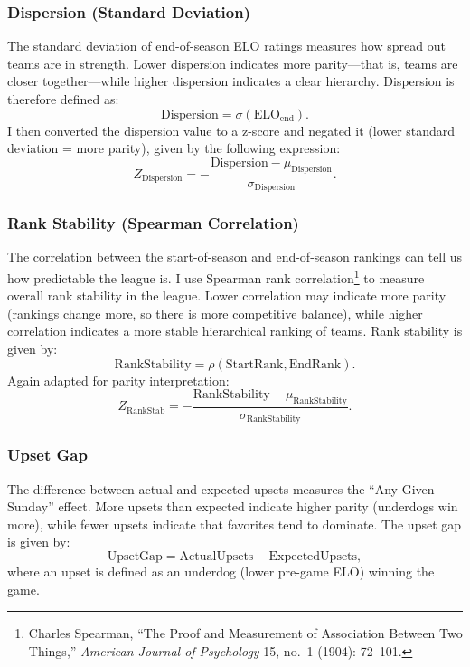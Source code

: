 \documentclass[a4paper,10.5pt,twoside]{article}
\begin{document}
\subsubsection{Dispersion (Standard Deviation)}

The standard deviation of end-of-season ELO ratings measures how spread out teams are in strength. Lower dispersion indicates more parity—that is, teams are closer together—while higher dispersion indicates a clear hierarchy. Dispersion is therefore defined as:
\[
\text{Dispersion} = \sigma(\text{ELO}_{\text{end}}).
\]
I then converted the dispersion value to a z-score and negated it (lower standard deviation = more parity), given by the following expression:
\[
Z_{\text{Dispersion}} = -\frac{\text{Dispersion} - \mu_{\text{Dispersion}}}{\sigma_{\text{Dispersion}}}.
\]

\subsubsection{Rank Stability (Spearman Correlation)}

The correlation between the start-of-season and end-of-season rankings can tell us how predictable the league is. I use Spearman rank correlation\footnote{Charles Spearman, ``The Proof and Measurement of Association Between Two Things,'' \textit{American Journal of Psychology} 15, no.\ 1 (1904): 72--101.} to measure overall rank stability in the league. Lower correlation may indicate more parity (rankings change more, so there is more competitive balance), while higher correlation indicates a more stable hierarchical ranking of teams. Rank stability is given by:
\[
\text{RankStability} = \rho(\text{StartRank}, \text{EndRank}).
\]
Again adapted for parity interpretation:
\[
Z_{\text{RankStab}} = -\frac{\text{RankStability} - \mu_{\text{RankStability}}}{\sigma_{\text{RankStability}}}.
\]

\newpage

\subsubsection{Upset Gap}

The difference between actual and expected upsets measures the “Any Given Sunday” effect. More upsets than expected indicate higher parity (underdogs win more), while fewer upsets indicate that favorites tend to dominate. The upset gap is given by:
\[
\text{UpsetGap} = \text{ActualUpsets} - \text{ExpectedUpsets},
\]
where an upset is defined as an underdog (lower pre-game ELO) winning the game.
\end{document}
